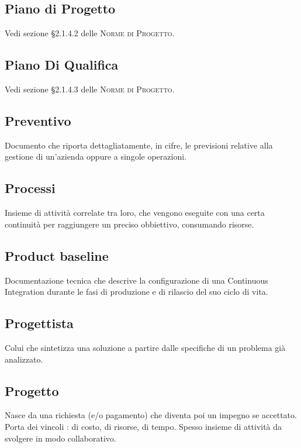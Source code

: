 \documentclass[../glossario.tex]{subfiles}
\begin{document}
\subsection*{Piano di Progetto}
Vedi sezione \S2.1.4.2 delle \textsc{Norme di Progetto}.

\subsection*{Piano Di Qualifica} 
Vedi sezione \S2.1.4.3 delle \textsc{Norme di Progetto}.

\subsection*{Preventivo}
Documento che riporta dettagliatamente, in cifre, le previsioni relative alla gestione di un'azienda oppure a singole operazioni.

\subsection*{Processi} 
Insieme di attività correlate tra loro, che vengono eseguite con una certa continuità per raggiungere un preciso obbiettivo, consumando risorse.

\subsection*{Product baseline} 
Documentazione tecnica che descrive la configurazione di una Continuous Integration durante le fasi di produzione e di rilascio del suo ciclo di vita.

\subsection*{Progettista} 
Colui che sintetizza una soluzione a partire dalle specifiche di un problema già analizzato.

\subsection*{Progetto} 
Nasce da una richiesta (e/o pagamento) che diventa poi un impegno se accettato. Porta dei vincoli : di costo, di risorse, di tempo. Spesso insieme di attività da svolgere in modo collaborativo.
\end{document}
